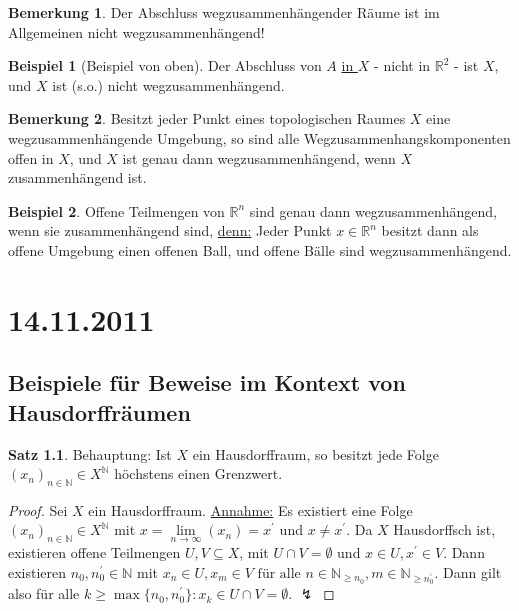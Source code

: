 \documentclass[a4paper,11pt,notitlepage]{report}
\theoremstyle{definition}
\newtheorem{theorem}{Satz}[chapter]
\newtheorem{remark}{Bemerkung}[chapter]
\newtheorem{example}{Beispiel}[chapter]
\newcommand{\R}{{\ensuremath{\mathbb{R}}}}
\newcommand{\N}{{\ensuremath{\mathbb{N}}}}
\begin{document}
\begin{remark}
	Der Abschluss wegzusammenhängender Räume ist im Allgemeinen nicht wegzusammenhängend!
\end{remark}

\begin{example}[Beispiel von oben]
	Der Abschluss von $A$ \underline{in $X$} - nicht in $\R^2$ - ist $X$, und $X$ ist (s.o.) nicht wegzusammenhängend.
\end{example}

\begin{remark}
	Besitzt jeder Punkt eines topologischen Raumes $X$ eine wegzusammenhängende Umgebung, so sind alle Wegzusammenhangskomponenten offen in $X$, und $X$ ist genau dann wegzusammenhängend, wenn $X$ zusammenhängend ist.
\end{remark}

\begin{example}
	Offene Teilmengen von $\R^n$ sind genau dann wegzusammenhängend, wenn sie zusammenhängend sind, \underline{denn:}
	\newline
	Jeder Punkt $x \in \R^n$ besitzt dann als offene Umgebung einen offenen Ball, und offene Bälle sind wegzusammenhängend.
\end{example}

\chapter{14.11.2011}
\section{Beispiele für Beweise im Kontext von Hausdorffräumen}
\begin{theorem}{Behauptung:}
Ist $X$ ein Hausdorffraum, so besitzt jede Folge $(x_n)_{n \in \N} \in X^\N$ höchstens einen Grenzwert.
\end{theorem}
\begin{proof}
	Sei $X$ ein Hausdorffraum.
	\newline
	\underline{Annahme:} Es existiert eine Folge $(x_n)_{n \in \N} \in X^\N$ mit $x = \lim\limits_{n \rightarrow \infty}(x_n) = x^\prime$ und $x \neq x^\prime$.
	\newline
	Da $X$ Hausdorffsch ist, existieren offene Teilmengen $U,V \subseteq X$, mit $U \cap V = \emptyset$ und $x \in U, x^\prime \in V$. Dann existieren $n_0, n_0^\prime \in \N$ mit $x_n \in U, x_m \in V \text{ für alle } n \in \N_{\geq n_0}, m \in \N_{\geq n_0^\prime}$. Dann gilt also für alle $k \geq \max\{n_0,n_0^\prime\} \colon x_k \in U \cap V=\emptyset$. $\lightning$
\end{proof}
\end{document}

